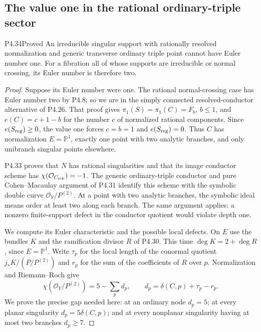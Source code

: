 \subsection{The value one in the rational ordinary-triple sector}

\begin{statement}{P4.34}{Proved}
An irreducible singular support with rationally resolved
normalization and generic transverse ordinary triple point
cannot have Euler number one. For a fibration all of whose
supports are irreducible or normal crossing, its Euler number
is therefore two.
\end{statement}
\begin{proof}
Suppose its Euler number were one. The rational
normal-crossing case has Euler number two by P4.8, so we
are in the simply connected resolved-conductor alternative
of P4.26. That proof gives $\pi_1(S)=\pi_1(C)=F_b$,
$b\le1$, and
$e(C)=c+1-b$ for the number $c$ of normalized rational
components. Since $e(S_{\rm reg})\ge0$, the value one
forces $c=b=1$ and $e(S_{\rm reg})=0$.
Thus $C$ has normalization $E=\mathbb P^1$, exactly one
point with two analytic branches, and only unibranch
singular points elsewhere.

P4.33 proves that $N$ has rational singularities and
that its image conductor scheme has
$\chi(\mathcal O_{C_{\rm sch}})=-1$.
The generic ordinary-triple conductor and pure
Cohen--Macaulay argument of P4.31 identify this scheme
with the symbolic double curve $\mathcal O_Y/P^{(2)}$.
At a point with two analytic branches, the symbolic ideal
means order at least two along each branch. The same
argument applies: a nonzero finite-support defect in the
conductor quotient would violate depth one.

We compute its Euler characteristic and the possible
local defects. On $E$ use the bundles $K$ and the
ramification divisor $R$ of P4.30. This time
$\deg K=2+\deg R$, since $E=\mathbb P^1$.
Write $\tau_p$ for the local length of the conormal
quotient $j_*K/(P/P^{(2)})$ and $r_p$ for the sum of
the coefficients of $R$ over $p$. Normalization and
Riemann--Roch give
\[
 \chi(\mathcal O_Y/P^{(2)})
 =5-\sum_p d_p,
 \qquad d_p=\delta(C,p)+\tau_p-r_p.
\]
We prove the precise gap needed here: at an ordinary
node $d_p=5$; at every planar singularity
$d_p=5\delta(C,p)$; and at every nonplanar singularity
having at most two branches $d_p\ge7$.


\end{proof}
